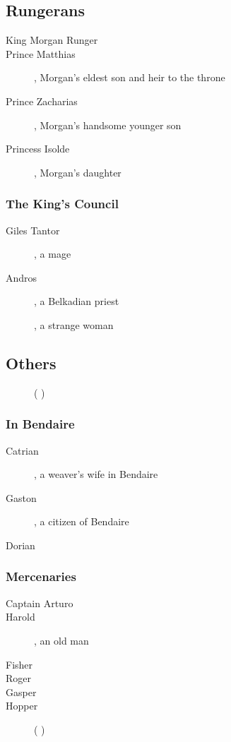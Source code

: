 \subsection{Rungerans}
\begin{description}
	\item[King Morgan Runger]
	\item[Prince Matthias], Morgan's eldest son and heir to the throne
	\item[Prince Zacharias], Morgan's handsome younger son
	\item[Princess Isolde], Morgan's daughter	
\end{description}
\subsubsection{The King's Council}
\begin{description}
	\item[Giles Tantor], a mage
	\item[\Pater{} Andros], a Belkadian priest
	\item[\Takestsha], a strange woman 
\end{description}



\subsection{Others}
\begin{description}
  \item[\Nzessuacrith]
  \item[\HriistD]
  \item[\Ishnaruchaefir]
  \item[\Psiotai]
	\item[\VizicarFull] (\human{} \Mars)
\end{description}
\subsubsection{In Bendaire}
\begin{description}
	\item[Catrian], a weaver's wife in Bendaire
	\item[Gaston], a citizen of Bendaire
	\item[\Mr{} Dorian]
\end{description}
\subsubsection{Mercenaries}
\begin{description}
	\item[Captain Arturo] 
	\item[Harold], an old man
	\item[Fisher]
	\item[Roger]
	\item[Gasper]
	\item[Hopper] (\meccaran{} \Venus)
\end{description}







